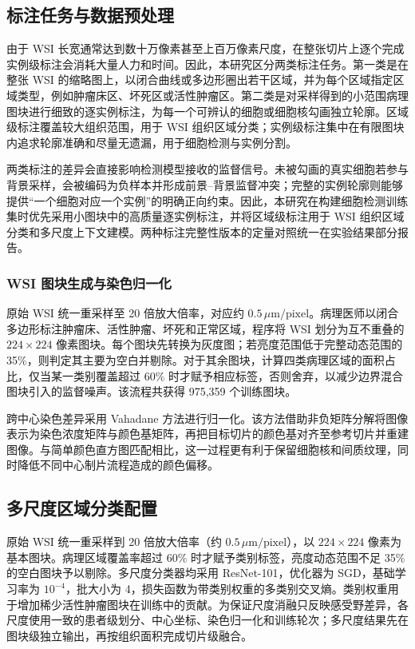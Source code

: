 \subsection{标注任务与数据预处理}
由于 WSI 长宽通常达到数十万像素甚至上百万像素尺度，在整张切片上逐个完成实例级标注会消耗大量人力和时间。因此，本研究区分两类标注任务。第一类是在整张 WSI 的缩略图上，以闭合曲线或多边形圈出若干区域，并为每个区域指定区域类型，例如肿瘤床区、坏死区或活性肿瘤区。第二类是对采样得到的小范围病理图块进行细致的逐实例标注，为每一个可辨认的细胞或细胞核勾画独立轮廓。区域级标注覆盖较大组织范围，用于 WSI 组织区域分类；实例级标注集中在有限图块内追求轮廓准确和尽量无遗漏，用于细胞检测与实例分割。

两类标注的差异会直接影响检测模型接收的监督信号。未被勾画的真实细胞若参与背景采样，会被编码为负样本并形成前景--背景监督冲突；完整的实例轮廓则能够提供“一个细胞对应一个实例”的明确正向约束。因此，本研究在构建细胞检测训练集时优先采用小图块中的高质量逐实例标注，并将区域级标注用于 WSI 组织区域分类和多尺度上下文建模。两种标注完整性版本的定量对照统一在实验结果部分报告。

\subsubsection{WSI 图块生成与染色归一化}
原始 WSI 统一重采样至 20 倍放大倍率，对应约 $0.5\,\mu\mathrm{m}/\mathrm{pixel}$。病理医师以闭合多边形标注肿瘤床、活性肿瘤、坏死和正常区域，程序将 WSI 划分为互不重叠的 $224\times224$ 像素图块。每个图块先转换为灰度图；若亮度范围低于完整动态范围的 35\%，则判定其主要为空白并剔除。对于其余图块，计算四类病理区域的面积占比，仅当某一类别覆盖超过 60\% 时才赋予相应标签，否则舍弃，以减少边界混合图块引入的监督噪声。该流程共获得 975,359 个训练图块。

跨中心染色差异采用 Vahadane 方法进行归一化。该方法借助非负矩阵分解将图像表示为染色浓度矩阵与颜色基矩阵，再把目标切片的颜色基对齐至参考切片并重建图像。与简单颜色直方图匹配相比，这一过程更有利于保留细胞核和间质纹理，同时降低不同中心制片流程造成的颜色偏移。

\subsection{多尺度区域分类配置}
原始 WSI 统一重采样到 20 倍放大倍率（约 $0.5\,\mu\mathrm{m}/\mathrm{pixel}$），以 $224\times224$ 像素为基本图块。病理区域覆盖率超过 60\% 时才赋予类别标签，亮度动态范围不足 35\% 的空白图块予以剔除。多尺度分类器均采用 ResNet-101，优化器为 SGD，基础学习率为 $10^{-4}$，批大小为 4，损失函数为带类别权重的多类别交叉熵。类别权重用于增加稀少活性肿瘤图块在训练中的贡献。为保证尺度消融只反映感受野差异，各尺度使用一致的患者级划分、中心坐标、染色归一化和训练轮次；多尺度结果先在图块级独立输出，再按组织面积完成切片级融合。

